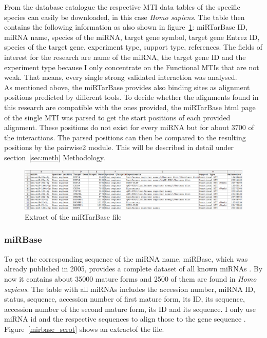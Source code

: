 \documentclass[12pt]{article}
\begin{document}
From the database catalogue the respective MTI data tables of the specific species can easily be downloaded, in this case \textit{Homo sapiens}. The table then contains the following information as also shown in figure~\ref{mirtarbase_scrot}: miRTarBase ID, miRNA name, species of the miRNA, target gene symbol, target gene Entrez ID, species of the target gene, experiment type, support type, references. The fields of interest for the research are name of the miRNA, the target gene ID and the experiment type because I only concentrate on the Functional MTIs that are not weak. That means, every single strong validated interaction was analysed.\\

As mentioned above, the miRTarBase provides also binding sites as alignment positions predicted by different tools. To decide whether the alignments found in this research are compatible with the ones provided, the miRTarBase html page of the single MTI was parsed to get the start positions of each provided alignment. These positions do not exist for every miRNA but for about 3700 of the interactions. The parsed positions can then be compared to the resulting positions by the pairwise2 module. This will be described in detail under section~\ref{sec:meth} Methodology.\\ 

\begin{figure}[h]
\centering
\includegraphics[width=\textwidth]{results/mirtarbase_scrot.png}
\caption{Extract of the miRTarBase file}
\label{mirtarbase_scrot}
\end{figure}


\subsubsection{miRBase}
To get the corresponding sequence of the miRNA name, miRBase, which was already published in 2005, provides a complete dataset of all known miRNAs \cite{Griffiths-Jones}. By now it contains about 35000 mature forms and 2500 of them are found in \textit{Homo sapiens}. The table with all miRNAs includes the accession number, miRNA ID, status, sequence, accession number of first mature form, its ID, its sequence, accession number of the second mature form, its ID and its sequence. I only use miRNA id and the respective sequences to align those to the gene sequence \cite{mirbase}. Figure~\ref{mirbase_scrot} shows an extractof the file.
\end{document}
